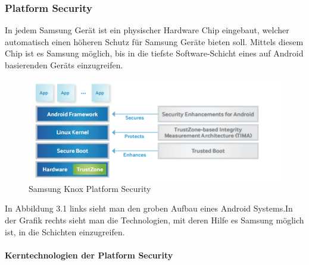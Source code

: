 \subsubsection{Platform Security}
In jedem Samsung Gerät ist ein physischer Hardware Chip eingebaut, welcher automatisch einen höheren Schutz für Samsung Geräte bieten soll. Mittels diesem Chip ist es Samsung möglich, bis in die tiefste Software-Schicht eines auf Android basierenden Geräts einzugreifen.
\begin{figure}[H]
\centering
\includegraphics[scale=0.9]{Images/samsung_knox_platform_security}
\caption{Samsung Knox Platform Security}
\end{figure}
In Abbildung 3.1 links sieht man den groben Aufbau eines Android Systems.In der Grafik rechts sieht man die Technologien, mit deren Hilfe es Samsung möglich ist, in die Schichten einzugreifen.
\paragraph{Kerntechnologien der Platform Security}

